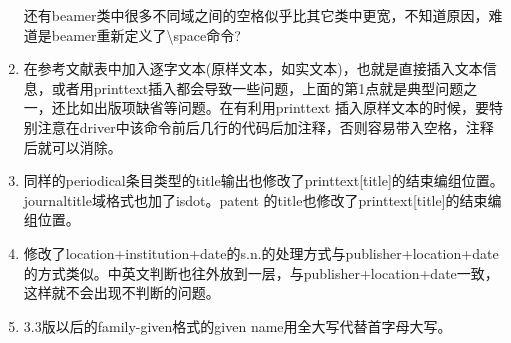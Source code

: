 \begin{enumerate}
还有beamer类中很多不同域之间的空格似乎比其它类中更宽，不知道原因，难道是beamer重新定义了\textbackslash space命令?

\item 在参考文献表中加入逐字文本(原样文本，如实文本)，也就是直接插入文本信息，或者用printtext插入都会导致一些问题，上面的第1点就是典型问题之一，还比如出版项缺省等问题。在有利用printtext 插入原样文本的时候，要特别注意在driver中该命令前后几行的代码后加注释，否则容易带入空格，注释后就可以消除。

\item 同样的periodical条目类型的title输出也修改了printtext[title]的结束编组位置。journaltitle域格式也加了isdot。patent 的title也修改了printtext[title]的结束编组位置。

\item 修改了location+institution+date的s.n.的处理方式与publisher+location+date的方式类似。中英文判断也往外放到一层，与publisher+location+date一致，这样就不会出现不判断的问题。

\item 3.3版以后的family-given格式的given name用全大写代替首字母大写。
\end{enumerate}


